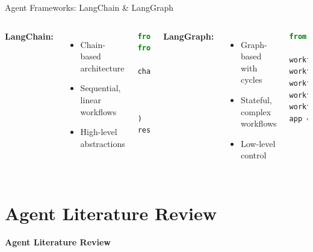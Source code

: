 \documentclass[aspectratio=169]{beamer}
\begin{document}
\begin{frame}[fragile]{Agent Frameworks: LangChain \& LangGraph}
	\begin{columns}
		\textbf{LangChain:}
		\begin{itemize}
			\item Chain-based architecture
			\item Sequential, linear workflows
			\item High-level abstractions
		\end{itemize}
		\begin{lstlisting}[language=python]
from langchain.chains import LLMChain
from langchain.llms import OpenAI

chain = LLMChain(
    llm=OpenAI(),
    prompt=prompt_template,
    memory=ConversationBufferMemory()
)
result = chain.run(query)
\end{lstlisting}
		
		\textbf{LangGraph:}
		\begin{itemize}
			\item Graph-based with cycles
			\item Stateful, complex workflows
			\item Low-level control
		\end{itemize}
		\begin{lstlisting}[language=python]
from langgraph.graph import StateGraph

workflow = StateGraph(state_schema)
workflow.add_node("plan", planning_node)
workflow.add_node("act", action_node)
workflow.add_edge("plan", "act")
workflow.add_conditional_edges("act", should_continue)
app = workflow.compile()
\end{lstlisting}
	\end{columns}
\end{frame}

\section{Agent Literature Review}

\begin{frame}
	\begin{center}
		\Large
		\textbf{Agent Literature Review}
	\end{center}
\end{frame}
\end{document}
